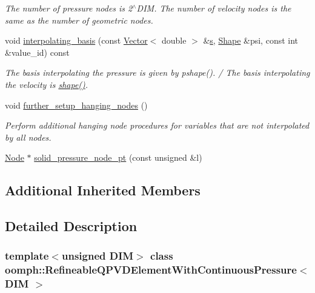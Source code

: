 \begin{DoxyCompactItemize}
\begin{DoxyCompactList}\small\item\em The number of pressure nodes is 2$^\wedge$\+D\+IM. The number of velocity nodes is the same as the number of geometric nodes. \end{DoxyCompactList}\item 
void \hyperlink{classoomph_1_1RefineableQPVDElementWithContinuousPressure_a207dc7a156db01065f965adf6cfc41fd}{interpolating\+\_\+basis} (const \hyperlink{classoomph_1_1Vector}{Vector}$<$ double $>$ \&\hyperlink{cfortran_8h_ab7123126e4885ef647dd9c6e3807a21c}{s}, \hyperlink{classoomph_1_1Shape}{Shape} \&psi, const int \&value\+\_\+id) const
\begin{DoxyCompactList}\small\item\em The basis interpolating the pressure is given by pshape(). / The basis interpolating the velocity is \hyperlink{classoomph_1_1FiniteElement_a58a25b6859ddd43b7bfe64a19fee5023}{shape()}. \end{DoxyCompactList}\item 
void \hyperlink{classoomph_1_1RefineableQPVDElementWithContinuousPressure_ad7b2c17ed107adb4b231dd3f748122ed}{further\+\_\+setup\+\_\+hanging\+\_\+nodes} ()
\begin{DoxyCompactList}\small\item\em Perform additional hanging node procedures for variables that are not interpolated by all nodes. \end{DoxyCompactList}\item 
\hyperlink{classoomph_1_1Node}{Node} $\ast$ \hyperlink{classoomph_1_1RefineableQPVDElementWithContinuousPressure_a78ac41286548a45383abb385a1be4598}{solid\+\_\+pressure\+\_\+node\+\_\+pt} (const unsigned \&l)
\end{DoxyCompactItemize}
\subsection*{Additional Inherited Members}


\subsection{Detailed Description}
\subsubsection*{template$<$unsigned D\+IM$>$\newline
class oomph\+::\+Refineable\+Q\+P\+V\+D\+Element\+With\+Continuous\+Pressure$<$ D\+I\+M $>$}

